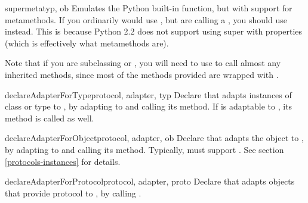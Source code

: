 \begin{verbatim%
}
\begin{verbatim%
}
\begin{verbatim%
}
\begin{verbatim%
}
\begin{verbatim%
}
\begin{verbatim%
}
\begin{funcdesc}{supermeta}{typ, ob}
Emulates the Python built-in  function, but with support for
metamethods.  If you ordinarily would use , but are calling a
, you should use  instead.  This is
because Python 2.2 does not support using super with properties (which is
effectively what metamethods are).

Note that if you are subclassing  or , you
will need to use  to call almost any inherited methods,
since most of the methods provided are wrapped with .
\end{funcdesc}

\begin{funcdesc}{declareAdapterForType}{protocol, adapter, typ }
Declare that  adapts instances of class or type 
to , by adapting  to  and
calling its  method.  If  is adaptable
to , its  method is
called as well.
\end{funcdesc}


\begin{funcdesc}{declareAdapterForObject}{protocol, adapter, ob }
Declare that  adapts the object  to , by
adapting  to  and calling its
 method.  Typically,  must support
.  See section \ref{protocols-instances} for details.
\end{funcdesc}


\begin{funcdesc}{declareAdapterForProtocol}{protocol, adapter, proto }
Declare that  adapts objects that provide protocol 
to , by calling
.

\end{funcdesc}
















\end{verbatim%
}
\end{verbatim%
}
\end{verbatim%
}
\end{verbatim%
}
\end{verbatim%
}
\end{verbatim%
}
